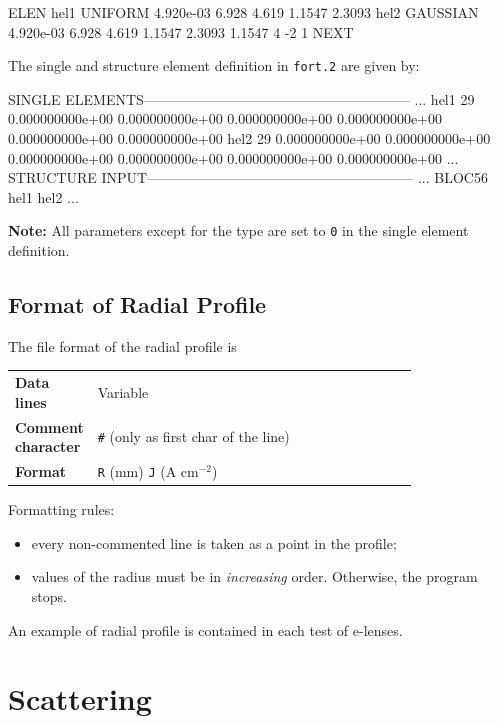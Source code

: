 \begin{cverbatim}
ELEN
hel1 UNIFORM  4.920e-03 6.928 4.619 1.1547 2.3093
hel2 GAUSSIAN 4.920e-03 6.928 4.619 1.1547 2.3093 1.1547 4 -2 1
NEXT
\end{cverbatim}
The single and structure element definition in \texttt{fort.2} are given by:
\begin{ctverbatim}
SINGLE ELEMENTS---------------------------------------------------------
...
hel1            29  0.000000000e+00  0.000000000e+00  0.000000000e+00  0.000000000e+00  0.000000000e+00  0.000000000e+00
hel2            29  0.000000000e+00  0.000000000e+00  0.000000000e+00  0.000000000e+00  0.000000000e+00  0.000000000e+00
...
STRUCTURE INPUT---------------------------------------------------------
...
BLOC56            hel1              hel2
...
\end{ctverbatim}

\bigskip
\noindent \textbf{Note:} All parameters except for the type are set to \texttt{0} in the single element definition.

\subsection{Format of Radial Profile} \label{sec:elen_rad_prof}
The file format of the radial profile is

\bigskip
\begin{tabular}{@{}lp{0.8\linewidth}}
    \textbf{Data lines} & Variable \\
    \textbf{Comment character} & \texttt{\#} (only as first char of the line) \\
    \textbf{Format}     & \texttt{R} (mm) \texttt{J} (A cm$^{-2}$) \\
\end{tabular}

Formatting rules:
\begin{itemize}
\item every non-commented line is taken as a point in the profile;
\item values of the radius must be in \emph{increasing} order. Otherwise, the program stops.
\end{itemize}

An example of radial profile is contained in each test of e-lenses.

\section{Scattering} \label{sec:scatter}


